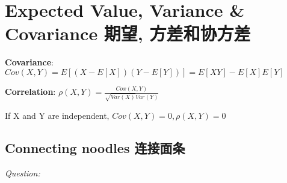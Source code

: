 \documentclass[12pt]{book}
\begin{document}
 \section{Expected Value, Variance \& Covariance 期望, 方差和协方差}
 \textbf{Covariance}: $Cov(X,Y)=E[(X-E[X])(Y-E[Y])]=E[XY]-E[X]E[Y]$

\textbf{Correlation}: $\rho(X,Y)=\frac{Cox(X,Y)}{\sqrt{Var(X)}Var(Y)}$
 
 If X and Y are independent, $Cov(X,Y)=0, \rho(X,Y)=0$
 
   \subsection{Connecting noodles 连接面条}
\noindent \textit{Question:}  
 
 
 
 
 
 
 
 
 
 
 
 
 
 
 
 
 
 
 
 
 
 
 
 
 
 
 
 
 
 
 
 
 
 
 
 
 
 
 
 
 
 
 
 
 
 
 
 
 
 
 
 
 
 
 
 
 
 
 
 
 
 
 
 
 
 
 
 
 
 
 
 
 
 
 
 
 
 
 
 
 
 
 
\end{document}
